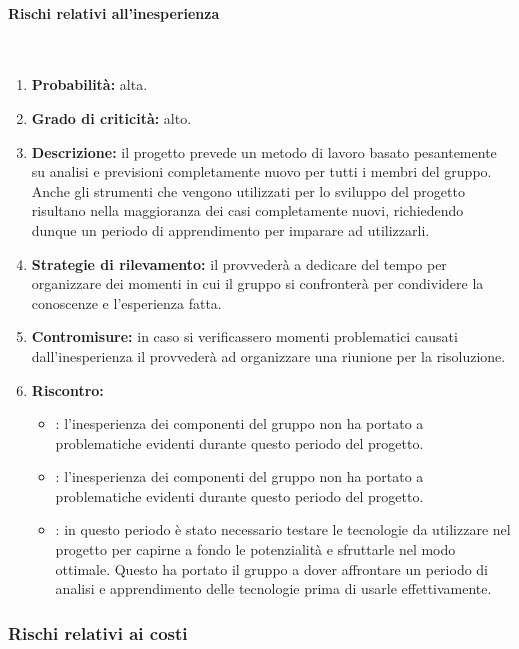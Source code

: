 \paragraph{Rischi relativi all'inesperienza}\mbox{}\\
\begin{enumerate}
	\item \textbf{Probabilità:} alta.
	\item \textbf{Grado di criticità:} alto.
	\item \textbf{Descrizione:} il progetto prevede un metodo di lavoro basato pesantemente su analisi e previsioni completamente nuovo per tutti i membri del gruppo. Anche gli strumenti che vengono utilizzati per lo sviluppo del progetto risultano nella maggioranza dei casi completamente nuovi, richiedendo dunque un periodo di apprendimento per imparare ad utilizzarli.
	\item \textbf{Strategie di rilevamento:} il \Responsabile{} provvederà a dedicare del tempo per organizzare dei momenti in cui il gruppo si confronterà per condividere la conoscenze e l'esperienza fatta.
	\item \textbf{Contromisure:} in caso si verificassero momenti problematici causati dall'inesperienza il \Responsabile{} provvederà ad organizzare una riunione per la risoluzione.
	\item \textbf{Riscontro:}
	\begin{itemize}
	\item \AR: l'inesperienza dei componenti del gruppo non ha portato a problematiche evidenti durante questo periodo del progetto.
	\item \AD: l'inesperienza dei componenti del gruppo non ha portato a problematiche evidenti durante questo periodo del progetto.
	\item \PA: in questo periodo è stato necessario testare le tecnologie da utilizzare nel progetto per capirne a fondo le potenzialità e sfruttarle nel modo ottimale. Questo ha portato il gruppo a dover affrontare un periodo di analisi e apprendimento delle tecnologie prima di usarle effettivamente.
	\end{itemize}
\end{enumerate}

\subsubsection{Rischi relativi ai costi}
